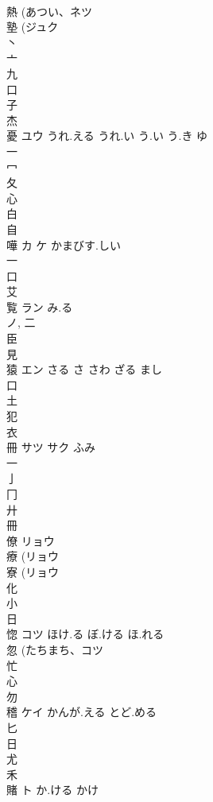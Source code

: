 \documentclass[8pt]{extreport}
\begin{document}
\begin{CJK}{UTF8}{min}
\\	熱 (あつい、ネツ 
\\	塾 (ジュク 
\\	丶 
\\	亠 
\\	九 
\\	口 
\\	子 
\\	杰	
\\	憂	ユウ	うれ.える うれ.い う.い う.き ゆ	
\\	一 
\\	冖 
\\	夂 
\\	心 
\\	白 
\\	自 
\\	嘩	カ ケ	かまびす.しい	
\\	一 
\\	口 
\\	艾 
\\	覧	ラン	み.る	
\\	ノ, 二 
\\	臣 
\\	見 
\\	猿	エン	さる さ さわ ざる まし	
\\	口 
\\	土 
\\	犯 
\\	衣 
\\	冊	サツ サク	ふみ	
\\	一 
\\	亅 
\\	冂 
\\	廾 
\\	冊 
\\	僚	リョウ		
\\	療 (リョウ 
\\	寮 (リョウ 
\\	化 
\\	小 
\\	日 
\\	惚	コツ	ほけ.る ぼ.ける ほ.れる	
\\	忽 (たちまち、コツ 
\\	忙 
\\	心 
\\	勿 
\\	稽	ケイ	かんが.える とど.める	
\\	匕 
\\	日 
\\	尤 
\\	禾 
\\	賭	ト	か.ける かけ	

\end{CJK}
\end{document}
